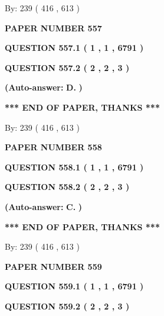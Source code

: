 \documentclass[12pt]{article}
\begin{document}
   
\hspace{1.0in} By: 
 239 ( 416 ,  613 )
   
   
   
   
\newpage 
\setcounter{page}{ 
   557001 } 
   
   
 {\textbf{ \Large{ PAPER NUMBER  557  }}}
   
   
   
   
  
  
{\textbf{\large{QUESTION
557.1 
 ( 1 , 1 , 6791 )
}}}
  
  
{\textbf{\large{QUESTION
557.2 
 ( 2 , 2 , 3 )
}}}
 
 
{\textbf{(Auto-answer:}}
{\textbf{\large{
D.}}}
{\textbf{)}}
 
 
   
   
   
   
\vspace{1.0in} 
{\textbf{\large{ *** END OF PAPER, THANKS *** }}} 
   
   
\hspace{1.0in} By: 
 239 ( 416 ,  613 )
   
   
   
   
\newpage 
\setcounter{page}{ 
   558001 } 
   
   
 {\textbf{ \Large{ PAPER NUMBER  558  }}}
   
   
   
   
  
  
{\textbf{\large{QUESTION
558.1 
 ( 1 , 1 , 6791 )
}}}
  
  
{\textbf{\large{QUESTION
558.2 
 ( 2 , 2 , 3 )
}}}
 
 
{\textbf{(Auto-answer:}}
{\textbf{\large{
C.}}}
{\textbf{)}}
 
 
   
   
   
   
\vspace{1.0in} 
{\textbf{\large{ *** END OF PAPER, THANKS *** }}} 
   
   
\hspace{1.0in} By: 
 239 ( 416 ,  613 )
   
   
   
   
\newpage 
\setcounter{page}{ 
   559001 } 
   
   
 {\textbf{ \Large{ PAPER NUMBER  559  }}}
   
   
   
   
  
  
{\textbf{\large{QUESTION
559.1 
 ( 1 , 1 , 6791 )
}}}
  
  
{\textbf{\large{QUESTION
559.2 
 ( 2 , 2 , 3 )
}}}
 
\end{document}
